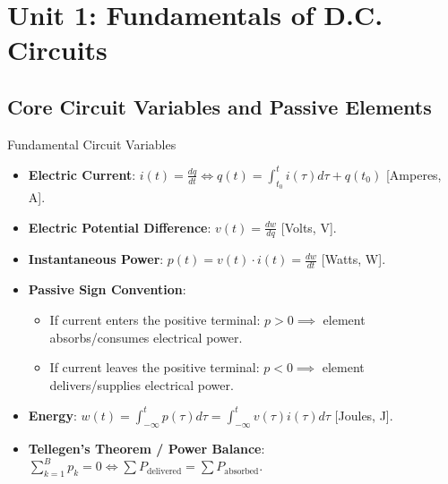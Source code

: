 \chapter{Unit 1: Fundamentals of D.C. Circuits}

\section{Core Circuit Variables and Passive Elements}

\begin{formulabox}{Fundamental Circuit Variables}
\begin{itemize}[leftmargin=1.5em]
    \item \textbf{Electric Current}: $i(t) = \frac{dq}{dt} \iff q(t) = \int_{t_0}^t i(\tau) d\tau + q(t_0)$ [Amperes, A].
    \item \textbf{Electric Potential Difference}: $v(t) = \frac{dw}{dq}$ [Volts, V].
    \item \textbf{Instantaneous Power}: $p(t) = v(t) \cdot i(t) = \frac{dw}{dt}$ [Watts, W].
    \item \textbf{Passive Sign Convention}:
    \begin{itemize}
        \item If current enters the positive terminal: $p > 0 \implies$ element absorbs/consumes electrical power.
        \item If current leaves the positive terminal: $p < 0 \implies$ element delivers/supplies electrical power.
    \end{itemize}
    \item \textbf{Energy}: $w(t) = \int_{-\infty}^t p(\tau) d\tau = \int_{-\infty}^t v(\tau) i(\tau) d\tau$ [Joules, J].
    \item \textbf{Tellegen's Theorem / Power Balance}: $\sum_{k=1}^B p_k = 0 \iff \sum P_{\text{delivered}} = \sum P_{\text{absorbed}}$.
\end{itemize}
\end{formulabox}

